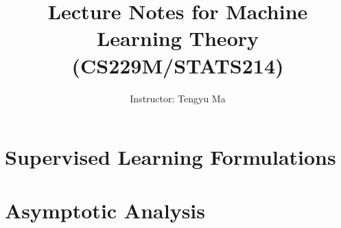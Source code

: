 \documentclass{book}
\theoremstyle{definition}
\theoremstyle{remark}
\numberwithin{section}{chapter}
\numberwithin{equation}{chapter}
\begin{document}
\frontmatter

\title{Lecture Notes for Machine Learning Theory (CS229M/STATS214)}


\author{Instructor: Tengyu Ma
}






\maketitle


\setcounter{page}{4}

\tableofcontents

%
\mainmatter
\let\sec\section
\let\subsec\subsection

\chapter{Supervised Learning Formulations}\label{chap:supervised}


\chapter{Asymptotic Analysis}\label{chap:asymp}

\end{document}

